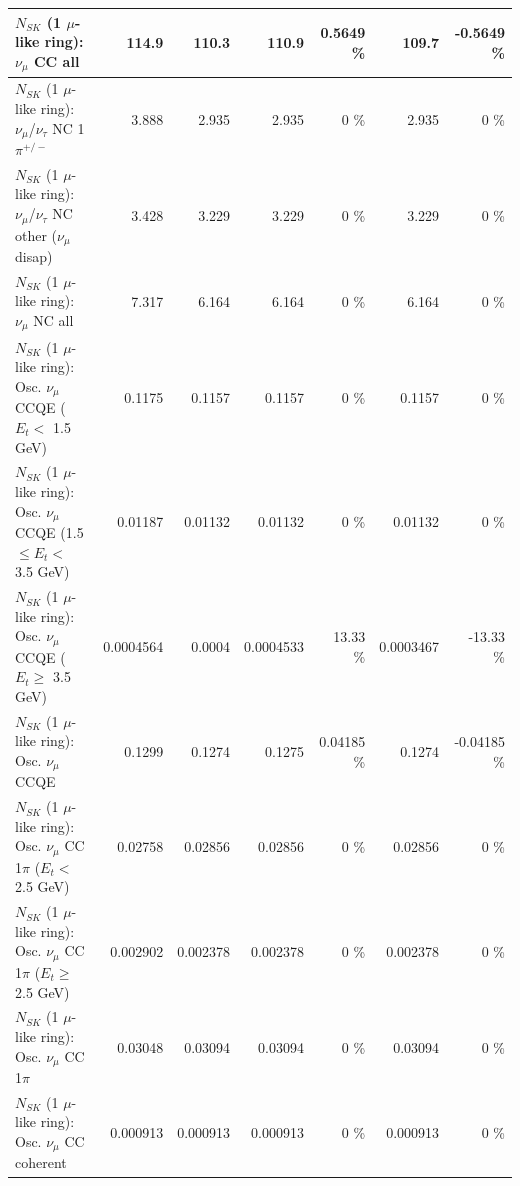 \begin{table}
\begin{tabular}{| l | r | r | r  r | r  r |}
                                $N_{SK}$ (1 $\mu$-like ring): $\nu_{\mu}$ CC all &           114.9 &           110.3 &           110.9 &   0.5649 \%  &           109.7 &  -0.5649 \%  \\ 
\hline
              $N_{SK}$ (1 $\mu$-like ring): $\nu_\mu$/$\nu_\tau$ NC 1$\pi^{+/-}$ &           3.888 &           2.935 &           2.935 &        0 \%  &           2.935 &        0 \%  \\ 
   $N_{SK}$ (1 $\mu$-like ring): $\nu_\mu$/$\nu_\tau$ NC other ($\nu_\mu$ disap) &           3.428 &           3.229 &           3.229 &        0 \%  &           3.229 &        0 \%  \\ 
                                $N_{SK}$ (1 $\mu$-like ring): $\nu_{\mu}$ NC all &           7.317 &           6.164 &           6.164 &        0 \%  &           6.164 &        0 \%  \\ 
\hline
\hline
           $N_{SK}$ (1 $\mu$-like ring): Osc. $\nu_\mu$ CCQE ($E_{t} <$ 1.5 GeV) &          0.1175 &          0.1157 &          0.1157 &        0 \%  &          0.1157 &        0 \%  \\ 
  $N_{SK}$ (1 $\mu$-like ring): Osc. $\nu_\mu$ CCQE (1.5 $\leq E_{t} <$ 3.5 GeV) &         0.01187 &         0.01132 &         0.01132 &        0 \%  &         0.01132 &        0 \%  \\ 
        $N_{SK}$ (1 $\mu$-like ring): Osc. $\nu_\mu$ CCQE ($E_{t} \geq$ 3.5 GeV) &       0.0004564 &          0.0004 &       0.0004533 &    13.33 \%  &       0.0003467 &   -13.33 \%  \\ 
\hline
                               $N_{SK}$ (1 $\mu$-like ring): Osc. $\nu_\mu$ CCQE &          0.1299 &          0.1274 &          0.1275 &  0.04185 \%  &          0.1274 & -0.04185 \%  \\ 
\hline
      $N_{SK}$ (1 $\mu$-like ring): Osc. $\nu_\mu$ CC 1$\pi$ ($E_{t} <$ 2.5 GeV) &         0.02758 &         0.02856 &         0.02856 &        0 \%  &         0.02856 &        0 \%  \\ 
   $N_{SK}$ (1 $\mu$-like ring): Osc. $\nu_\mu$ CC 1$\pi$ ($E_{t} \geq$ 2.5 GeV) &        0.002902 &        0.002378 &        0.002378 &        0 \%  &        0.002378 &        0 \%  \\ 
\hline
                          $N_{SK}$ (1 $\mu$-like ring): Osc. $\nu_\mu$ CC 1$\pi$ &         0.03048 &         0.03094 &         0.03094 &        0 \%  &         0.03094 &        0 \%  \\ 
                        $N_{SK}$ (1 $\mu$-like ring): Osc. $\nu_\mu$ CC coherent &        0.000913 &        0.000913 &        0.000913 &        0 \%  &        0.000913 &        0 \%  \\ 

\end{tabular}
\end{table}
